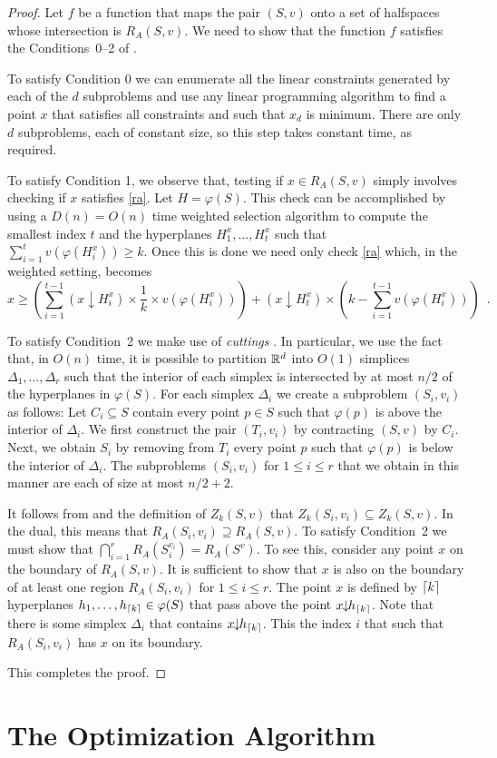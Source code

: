 \documentclass[lotsofwhite]{patmorin}
\newcommand{\drop}{\!\!\downarrow\!\!}
\newcommand{\dual}{\varphi}
\begin{document}
\begin{proof}
Let $f$ be a function that maps the pair $(S,v)$ onto a set of
halfspaces whose intersection is $R_A(S,v)$.  We need to show that the
function $f$ satisfies the Conditions~0--2 of .

To satisfy Condition 0 we can enumerate all the linear constraints
generated by each of the $d$ subproblems and use any linear
programming algorithm to find a point $x$ that satisfies all
constraints and such that $x_d$ is minimum.  There are only $d$
subproblems, each of constant size, so this step takes constant time,
as required.

To satisfy Condition 1, we observe that, testing if $x\in R_A(S,v)$
simply involves checking if $x$ satisfies \eqref{ra}.  Let
$H=\dual(S)$.  This check can be accomplished by using a $D(n)=O(n)$
time weighted selection algorithm \cite{X} to compute the smallest
index $t$ and the hyperplanes $H_{1}^x,\ldots,H_{t}^x$ such that
$\sum_{i=1}^tv(\dual(H_{i}^x)) \ge k$.  Once this is done we need only
check \eqref{ra} which, in the weighted setting, becomes 
\[
     x \ge \left(\sum_{i=1}^{t-1} (x\drop
H_i^x)\times\frac{1}{k}\times v(\dual(H_i^x))\right) 
   + (x\drop H_t^x) \times \left(k-\sum_{i=1}^{t-1} v(\dual(H_{i}^x)) \right)
\enspace .
\] 

To satisfy Condition~2 we make use of \emph{cuttings} \cite{X}.  In
particular, we use the fact that, in $O(n)$ time, it is possible to
partition $\mathbb{R}^d$ into $O(1)$ simplices
$\Delta_1,\ldots,\Delta_r$ such that the interior of each simplex is
intersected by at most $n/2$ of the hyperplanes in $\dual(S)$.  For
each simplex $\Delta_i$ we create a subproblem $(S_i,v_i)$ as follows:
Let $C_i\subseteq S$ contain every point $p\in S$ such that $\dual(p)$
is above the interior of $\Delta_i$.  We first construct the pair
$(T_i,v_i)$ by contracting $(S,v)$ by $C_i$.  Next, we obtain $S_i$ by
removing from $T_i$ every point $p$ such that $\dual(p)$ is below the
interior of $\Delta_i$.  The subproblems $(S_i,v_i)$ for $1\le i\le r$
that we obtain in this manner are each of size at most $n/2+2$.

It follows from  and the definition of $Z_k(S,v)$
that $Z_k(S_i,{v_i})\subseteq Z_k(S,v)$.  In the dual, this means that
$R_A(S_i,{v_i})\supseteq R_A(S,v)$.  To satisfy Condition~2 we must
show that $\bigcap_{i=1}^r R_A(S_i^{v_i}) = R_A(S^v)$.  To see this,
consider any point $x$ on the boundary of $R_A(S,v)$.  It is
sufficient to show that $x$ is also on the boundary of at least one
region $R_A(S_i,{v_i})$ for $1\le i\le r$.  The point $x$ is defined
by $\left\lceil k \right\rceil$ hyperplanes $h_1,\ldots,h_{\ceil{k}}\in\dual(S)$ that pass
above the point $x\drop h_{\ceil{k}}$.  Note that there is some
simplex $\Delta_i$ that contains
$x\drop h_{\ceil{k}}$.  This the index $i$ that such that
$R_A(S_i,v_i)$ has $x$ on its boundary.

This completes the proof.
\end{proof}


\section{The Optimization Algorithm}
\end{document}
